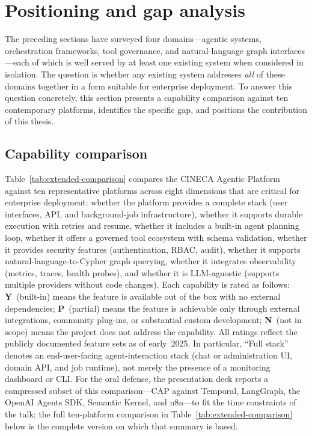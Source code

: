 \documentclass[a4paper,noexaminfo]{sapthesis}
\begin{document}
\section{Positioning and gap analysis}
\label{sec:gap-analysis}

The preceding sections have surveyed four domains---agentic systems,
orchestration frameworks, tool governance, and natural-language graph
interfaces---each of which is well served by at least one existing system
when considered in isolation.  The question is whether any existing system
addresses \emph{all} of these domains together in a form suitable for
enterprise deployment.  To answer this question concretely, this section
presents a capability comparison against ten contemporary platforms,
identifies the specific gap, and positions the contribution of this thesis.

\subsection{Capability comparison}

Table~\ref{tab:extended-comparison} compares the CINECA Agentic Platform
against ten representative platforms across eight dimensions that are
critical for enterprise deployment: whether the platform provides a
complete stack (user interfaces, API, and background-job infrastructure),
whether it supports durable execution with retries and resume, whether it
includes a built-in agent planning loop, whether it offers a governed tool
ecosystem with schema validation, whether it provides security features
(authentication, RBAC, audit), whether it supports natural-language-to-Cypher
graph querying, whether it integrates observability (metrics, traces, health
probes), and whether it is LLM-agnostic (supports multiple providers without
code changes).  Each capability is rated as follows: \textbf{Y}~(built-in)
means the feature is available out of the box with no external dependencies;
\textbf{P}~(partial) means the feature is achievable only through external
integrations, community plug-ins, or substantial custom development;
\textbf{N}~(not in scope) means the project does not address the capability.
All ratings reflect the publicly documented feature sets as of early~2025.
In particular, ``Full stack'' denotes an end-user-facing agent-interaction
stack (chat or administration UI, domain API, and job runtime), not merely
the presence of a monitoring dashboard or CLI.  For the oral defense, the
presentation deck reports a compressed subset of this comparison---CAP
against Temporal, LangGraph, the OpenAI Agents SDK, Semantic Kernel, and
n8n---to fit the time constraints of the talk; the full ten-platform
comparison in Table~\ref{tab:extended-comparison} below is the complete
version on which that summary is based.
\end{document}

